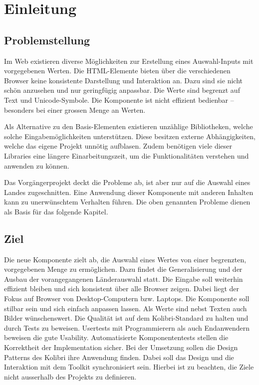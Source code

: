 \chapter{Einleitung}
\label{chap:intro}


\section{Problemstellung}
\label{sec:problem}

Im Web existieren diverse Möglichkeiten zur Erstellung eines Auswahl-Inputs mit vorgegebenen Werten. 
Die HTML-Elemente bieten über die verschiedenen Browser keine konsistente Darstellung und Interaktion an. 
Dazu sind sie nicht schön anzusehen und nur geringfügig anpassbar. 
Die Werte sind begrenzt auf Text und Unicode-Symbole. 
Die Komponente ist nicht effizient bedienbar – besonders bei einer grossen Menge an Werten. 

Als Alternative zu den Basis-Elementen existieren unzählige Bibliotheken, welche solche Eingabemöglichkeiten unterstützen. 
Diese besitzen externe Abhängigkeiten, welche das eigene Projekt unnötig aufblasen. 
Zudem benötigen viele dieser Libraries eine längere Einarbeitungszeit, um die Funktionalitäten verstehen und anwenden zu können. 

Das Vorgängerprojekt deckt die Probleme ab, ist aber nur auf die Auswahl eines Landes zugeschnitten. 
Eine Anwendung dieser Komponente mit anderen Inhalten kann zu unerwünschtem Verhalten führen. 
Die oben genannten Probleme dienen als Basis für das folgende Kapitel. 


\section{Ziel}
\label{sec:goal}

Die neue Komponente zielt ab, die Auswahl eines Wertes von einer begrenzten, vorgegebenen Menge zu ermöglichen. 
Dazu findet die Generalisierung und der Ausbau der vorangegangenen Länderauswahl statt. 
Die Eingabe soll weiterhin effizient bleiben und sich konsistent über alle Browser zeigen. 
Dabei liegt der Fokus auf Browser von Desktop-Computern bzw. Laptops. 
Die Komponente soll stilbar sein und sich einfach anpassen lassen. 
Als Werte sind nebst Texten auch Bilder wünschenswert. 
Die Qualität ist auf dem Kolibri-Standard zu halten und durch Tests zu beweisen. 
Usertests mit Programmierern als auch Endanwendern beweisen die gute Usability. 
Automatisierte Komponententests stellen die Korrektheit der Implementation sicher. 
Bei der Umsetzung sollen die Design Patterns des Kolibri ihre Anwendung finden. 
Dabei soll das Design und die Interaktion mit dem Toolkit synchronisiert sein. 
Hierbei ist zu beachten, die Ziele nicht ausserhalb des Projekts zu definieren. 


